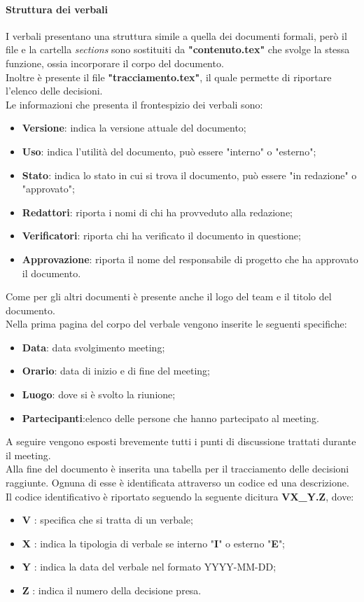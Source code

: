\paragraph{Struttura dei verbali} 
I verbali presentano una struttura simile a quella dei documenti formali, però il file e la cartella \textit{sections} sono sostituiti da \textbf{"contenuto.tex"} che svolge la stessa funzione, ossia incorporare il corpo del documento.\\
Inoltre è presente il file \textbf{"tracciamento.tex"}, il quale permette di riportare l'elenco delle decisioni.\\
Le informazioni che presenta il frontespizio dei verbali sono:
\begin{itemize}
	\item\textbf{Versione}: indica la versione attuale del documento;
	\item\textbf{Uso}: indica l'utilità del documento, può essere "interno" o "esterno";
	\item\textbf{Stato}: indica lo stato in cui si trova il documento, può essere "in redazione" o "approvato";
	\item\textbf{Redattori}: riporta i nomi di chi ha provveduto alla redazione;
	\item\textbf{Verificatori}: riporta chi ha verificato il documento in questione;
	\item\textbf{Approvazione}: riporta il nome del responsabile di progetto che ha approvato il documento.
\end{itemize}
Come per gli altri documenti è presente anche il logo del team e il titolo del documento.\\
Nella prima pagina del corpo del verbale vengono inserite le seguenti specifiche:
\begin{itemize}
    \item\textbf{Data}: data svolgimento meeting;
    \item\textbf{Orario}: data di inizio e di fine del meeting;
    \item\textbf{Luogo}: dove si è svolto la riunione;
    \item\textbf{Partecipanti}:elenco delle persone che hanno partecipato al meeting.
\end{itemize}
A seguire vengono esposti brevemente tutti i punti di discussione trattati durante il meeting.\\
Alla fine del documento è inserita una tabella per il tracciamento delle decisioni raggiunte. Ognuna di esse è identificata attraverso un codice ed una descrizione.\\
Il codice identificativo è riportato seguendo la seguente dicitura \textbf{VX\_Y.Z}, dove:
\begin{itemize}
    \item \textbf{V} : specifica che si tratta di un verbale;
	\item \textbf{X} : indica la tipologia di verbale se interno "\textbf{I}" o esterno "\textbf{E}";
	\item \textbf{Y} : indica la data del verbale nel formato YYYY-MM-DD; 
	\item \textbf{Z} : indica il numero della decisione presa.
\end{itemize}
    
